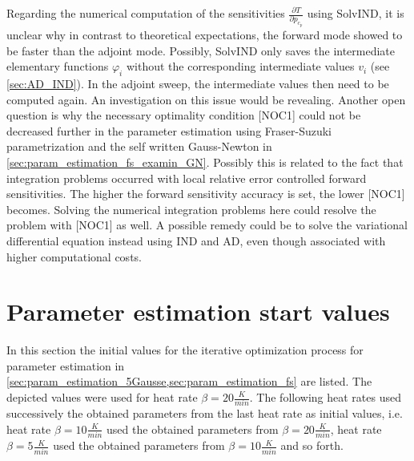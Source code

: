 \documentclass{scrartcl}[12pt, halfparskip]
\numberwithin{equation}{section}
\numberwithin{figure}{section}
\numberwithin{table}{section}
\begin{document}
Regarding the numerical computation of the sensitivities $\frac{\partial T}{\partial p_{c_p}}$ using SolvIND, it is unclear why in contrast to theoretical expectations, the forward mode showed to be faster than the adjoint mode.
Possibly, SolvIND only saves the intermediate elementary functions $\varphi_i$ without the corresponding intermediate values $v_i$ (see \cref{sec:AD_IND}). 
In the adjoint sweep, the intermediate values then need to be computed again. 
An investigation on this issue would be revealing. 
Another open question is why the necessary optimality condition [NOC1] could not be decreased further in the parameter estimation using Fraser-Suzuki parametrization and the self written Gauss-Newton in \cref{sec:param_estimation_fs_examin_GN}. 
Possibly this is related to the fact that integration problems occurred with local relative error controlled forward sensitivities. 
The higher the forward sensitivity accuracy is set, the lower [NOC1] becomes. 
Solving the numerical integration problems here could resolve the problem with [NOC1] as well. 
A possible remedy could be to solve the variational differential equation instead using IND and AD, even though associated with higher computational costs. \\








\newpage
\appendix
\section{Parameter estimation start values}
In this section the initial values for the iterative optimization process for parameter estimation in \cref{sec:param_estimation_5Gausse,sec:param_estimation_fs} are listed. The depicted values were used for heat rate $\beta = 20 \frac{K}{min}$. The following heat rates used successively the obtained parameters from the last heat rate as initial values, i.e. heat rate $\beta = 10 \frac{K}{min}$ used the obtained parameters from $\beta = 20 \frac{K}{min}$, heat rate $\beta = 5 \frac{K}{min}$ used the obtained parameters from $\beta = 10 \frac{K}{min}$ and so forth.
\end{document}
